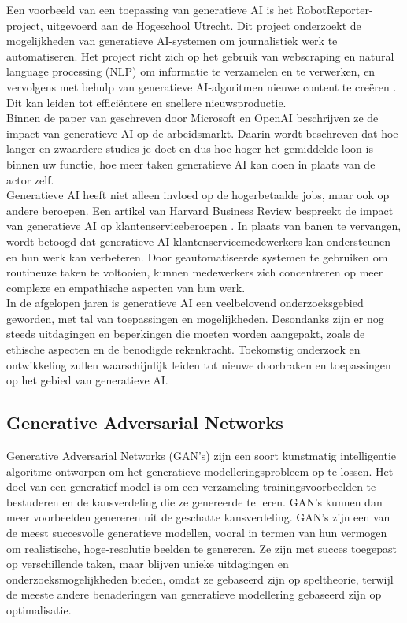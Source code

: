 Een voorbeeld van een toepassing van generatieve AI is het RobotReporter-project, uitgevoerd aan de Hogeschool Utrecht. Dit project onderzoekt de mogelijkheden van generatieve AI-systemen om journalistiek werk te automatiseren. Het project richt zich op het gebruik van webscraping en natural language processing (NLP) om informatie te verzamelen en te verwerken, en vervolgens met behulp van generatieve AI-algoritmen nieuwe content te creëren \autocite{HU2021}. Dit kan leiden tot efficiëntere en snellere nieuwsproductie. \\

Binnen de paper van geschreven door Microsoft en OpenAI beschrijven ze de impact van generatieve AI op de arbeidsmarkt. Daarin wordt beschreven dat hoe langer en zwaardere studies je doet en dus hoe hoger het gemiddelde loon is binnen uw functie, hoe meer taken generatieve AI kan doen in plaats van de actor zelf. \autocite{gpt_micai} \\ 

Generatieve AI heeft niet alleen invloed op de hogerbetaalde jobs, maar ook op andere beroepen. Een artikel van Harvard Business Review bespreekt de impact van generatieve AI op klantenserviceberoepen \autocite{HBR2023}. In plaats van banen te vervangen, wordt betoogd dat generatieve AI klantenservicemedewerkers kan ondersteunen en hun werk kan verbeteren. Door geautomatiseerde systemen te gebruiken om routineuze taken te voltooien, kunnen medewerkers zich concentreren op meer complexe en empathische aspecten van hun werk. \\

In de afgelopen jaren is generatieve AI een veelbelovend onderzoeksgebied geworden, met tal van toepassingen en mogelijkheden. Desondanks zijn er nog steeds uitdagingen en beperkingen die moeten worden aangepakt, zoals de ethische aspecten en de benodigde rekenkracht. Toekomstig onderzoek en ontwikkeling zullen waarschijnlijk leiden tot nieuwe doorbraken en toepassingen op het gebied van generatieve AI. \\

\subsection{Generative Adversarial Networks}
Generative Adversarial Networks (GAN's) zijn een soort kunstmatig intelligentie algoritme ontworpen om het generatieve modelleringsprobleem op te lossen. Het doel van een generatief model is om een verzameling trainingsvoorbeelden te bestuderen en de kansverdeling die ze genereerde te leren. GAN's kunnen dan meer voorbeelden genereren uit de geschatte kansverdeling. GAN's zijn een van de meest succesvolle generatieve modellen, vooral in termen van hun vermogen om realistische, hoge-resolutie beelden te genereren. Ze zijn met succes toegepast op verschillende taken, maar blijven unieke uitdagingen en onderzoeksmogelijkheden bieden, omdat ze gebaseerd zijn op speltheorie, terwijl de meeste andere benaderingen van generatieve modellering gebaseerd zijn op optimalisatie\cite{gan_goodfellow}.

